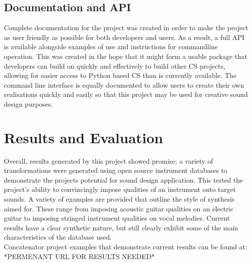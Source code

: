 \documentclass[titlepage]{scrartcl}
\begin{document}
    \subsection*{Documentation and API}
    Complete documentation for the project was created in order to make the
    project as user friendly as possible for both developers and users.  As a
    result, a full API is available alongside examples of use and instructions
    for commandline operation. This was created in the hope that it might form
    a usable package that developers can build on quickly and effectively to
    build other CS projects, allowing for easier access to Python based CS than
    is currently available. The command line interface is equally documented to
    allow users to create their own realisations quickly and easily so that
    this project may be used for creative sound design purposes.

    \section*{Results and Evaluation}
    Overall, results generated by this project showed promise; a variety of
    transformations were generated using open source instrument databases to
    demonstrate the projects potential for sound design application. This
    tested the project's ability to convincingly impose qualities of an
    instrument onto target sounds. A variety of examples are provided that
    outline the style of synthesis aimed for. These range from imposing
    acoustic guitar qualities on an electric guitar to imposing stringed
    instrument qualities on vocal melodies. Current results have a clear
    synthetic nature, but still clearly exhibit some of the main
    characteristics of the database used.\\

    \noindent
    Concatenator project examples that demonstrate current results can be found at:\\

    *PERMENANT URL FOR RESULTS NEEDED*\\
\end{document}
